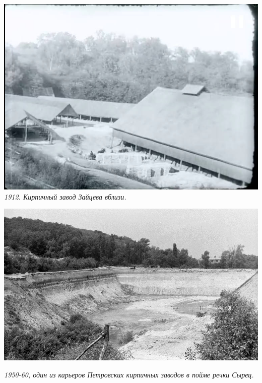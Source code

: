 \begin{center}
\includegraphics[width=\linewidth]{pix/zaic02.jpg}
\textit{1912. Кирпичный завод Зайцева вблизи.}
\end{center} 
\vspace*{\fill}
\newpage
\vspace*{\fill}
\begin{center}
\includegraphics[width=\linewidth]{pix/syrec-06.jpg}

\textit{1950-60, один из карьеров Петровских кирпичных заводов в пойме речки Сырец.}
\end{center} 



